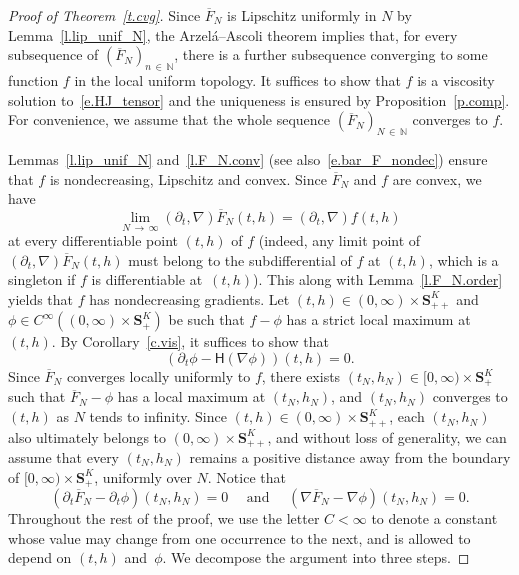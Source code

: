 \documentclass[AHL,Unicode,longabstracts,published]{cedram}
\newcommand{\N}{\mathbb{N}}
\renewcommand{\S}{\mathbf{S}}
\renewcommand{\H}{\mathsf{H}}
\renewcommand{\bar}{\overline}
\newcommand{\Ll}{\left}
\newcommand{\Rr}{\right}
\newcommand{\dr}{\partial}
\begin{document}
\begin{proof}[Proof of Theorem~\ref{t.cvg}]
Since $\bar F_N$ is Lipschitz uniformly in $N$ by Lemma~\ref{l.lip_unif_N}, the Arzelá--Ascoli theorem implies that, for every subsequence of $(\bar F_N)_{n\,\in\,\N}$, there is a further subsequence converging to some function $f$ in the local uniform topology. It suffices to show that $f$ is a viscosity solution to~\eqref{e.HJ_tensor} and the uniqueness is ensured by Proposition~\ref{p.comp}. For convenience, we assume that the whole sequence $(\bar F_N)_{N\,\in\,\N}$ converges to $f$.


Lemmas~\ref{l.lip_unif_N} and~\ref{l.F_N.conv} {(see also~\eqref{e.bar_F_nondec})} ensure that $f$ is nondecreasing, Lipschitz and convex. Since $\bar F_N$ and $f$ are convex, we have
\[
\lim_{N\,\to\,\infty}\Ll(\partial_t, \nabla\Rr)\bar F_N(t,h) = \Ll(\partial_t, \nabla\Rr)f(t,h)
\]
at every differentiable point $(t,h)$ of $f$ (indeed, any limit point of $(\partial_t, \nabla)\bar F_N(t,h)$ must belong to the subdifferential of $f$ at $(t,h)$, which is a singleton if $f$ is differentiable at~$(t,h)$). This along with Lemma~\ref{l.F_N.order} yields that $f$ has nondecreasing gradients. Let $(t,h)\in(0,\infty)\times \S^K_{++}$ and $\phi\in C^\infty((0,\infty)\times\S^K_+)$ be such that $f-\phi$ has a strict local maximum at $(t,h)$. By Corollary~\ref{c.vis}, it suffices to show that
\begin{equation}\label{e.eq.phi}
\Ll(\partial_t\phi-\H\Ll(\nabla\phi\Rr)\Rr)(t,h)=0.
\end{equation}
Since $\bar F_N$ converges locally uniformly to $f$, there exists $(t_N,h_N) \in [0,\infty) \times \S^K_+$ such that $\bar F_N - \phi$ has a local maximum at $(t_N,h_N)$, and $(t_N,h_N)$ converges to $(t,h)$ as $N$ tends to infinity. Since $(t,h) \in (0,\infty) \times \S^K_{++}$, each $(t_N,h_N)$ also ultimately belongs to $(0,\infty) \times \S^K_{++}$, and without loss of generality, we can assume that every $(t_N,h_N)$ remains a positive distance away from the boundary of $[0,\infty) \times \S^K_+$, uniformly over $N$. Notice that
\begin{equation}\label{e.gradient.equalities}
\Ll(\dr_t \bar F_N - \dr_t \phi\Rr)\Ll(t_N,h_N\Rr) = 0 \quad \text{ and } \quad \Ll(\nabla \bar F_N - \nabla \phi\Rr)\Ll(t_N,h_N\Rr) = 0.
\end{equation}
Throughout the rest of the proof, we use the letter $C < \infty$ to denote a constant whose value may change from one occurrence to the next, and is allowed to depend on $(t,h)$ and~$\phi$. We decompose the argument into three steps.


\end{proof}
\end{document}
